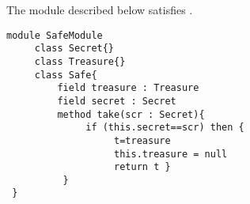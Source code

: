 The module   described  below satisfies  .

\begin{lstlisting}[frame=lines]
module SafeModule
     class Secret{}
     class Treasure{}
     class Safe{
         field treasure : Treasure
         field secret : Secret
         method take(scr : Secret){
              if (this.secret==scr) then {
                   t=treasure
                   this.treasure = null
                   return t } 
          }
 }
\end{lstlisting}

 
